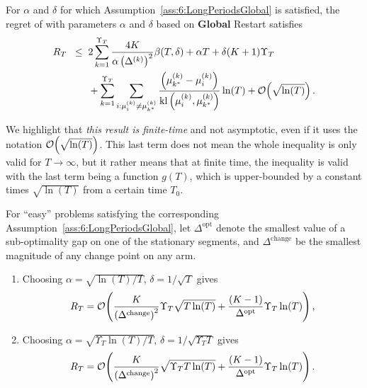 \begin{theorem}\label{thm:6:mainRegretBoundGlobal}
\begin{leftbar}[theorembar]  %
    For $\alpha$ and $\delta$ for which Assumption~\ref{ass:6:LongPeriodsGlobal} is satisfied, the regret of \GLRklUCB{} with parameters $\alpha$ and $\delta$ based on \textbf{Global} Restart satisfies
    \begin{align}
        R_T \;\; \leq \;\; & 2\sum_{k=1}^{\Upsilon_T} \frac{4K}{\alpha \left(\Delta^{(k)}\right)^2}\beta(T,\delta) +\alpha T + \delta (K+1)\Upsilon_T \\
        & + \sum_{k=1}^{\Upsilon_T}\sum_{i : \mu_i^{(k)} \neq \mu_{k^*}^{(k)}} \frac{\left( \mu_{k^*}^{(k)}-\mu_i^{(k)}\right)}{\mathrm{kl}\left(\mu_i^{(k)},\mu_{k^*}^{(k)}\right)}\ln(T) + \mathop{}\mathopen{}\mathcal{O}\mathopen{}\left(\sqrt{\ln(T)}\right). \nonumber
    \end{align}
\end{leftbar}  %
\end{theorem}

We highlight that \emph{this result is finite-time} and not asymptotic, even if it uses the notation $\mathop{}\mathopen{}\mathcal{O}\mathopen{}\left(\sqrt{\ln(T)}\right)$.
This last term does not mean the whole inequality is only valid for $T\to\infty$, but it rather means that at finite time, the inequality is valid with the last term being a function $g(T)$, which is upper-bounded by a constant times $\sqrt{\ln(T)}$ from a certain time $T_0$.

\begin{corollary}\label{cor:6:Global}
\begin{leftbar}[corollarybar]  %
    For ``easy'' problems satisfying the corresponding Assumption~\ref{ass:6:LongPeriodsGlobal},
    let $\Delta^{\text{opt}}$ denote the smallest value of a sub-optimality gap on one of the stationary segments, and $\Delta^{\text{change}}$ be the smallest magnitude of any change point on any arm.
    \begin{enumerate}
        \item Choosing $\alpha = \sqrt{\ln(T)/T}$, $\delta = 1/\sqrt{T}$ gives
        \begin{equation}
            R_T = \mathop{}\mathopen{}\mathcal{O}\mathopen{}\left(\frac{K}{\left(\Delta^{\text{change}}\right)^2} \Upsilon_T\sqrt{T\ln(T)} + \frac{(K-1)}{\Delta^{\text{opt}}} \Upsilon_T\ln(T)\right),
        \end{equation}
        \item Choosing $\alpha = \sqrt{\Upsilon_T\ln(T) / T}$, $\delta = 1 / \sqrt{\Upsilon_T T}$ gives
        \begin{equation}
            R_T = \mathop{}\mathopen{}\mathcal{O}\mathopen{}\left(\frac{K}{\left(\Delta^{\text{change}}\right)^2}\sqrt{\Upsilon_T T \ln(T)} + \frac{(K-1)}{\Delta^{\text{opt}}} \Upsilon_T\ln(T)\right).
        \end{equation}
    \end{enumerate}
\end{leftbar}  %
\end{corollary}


